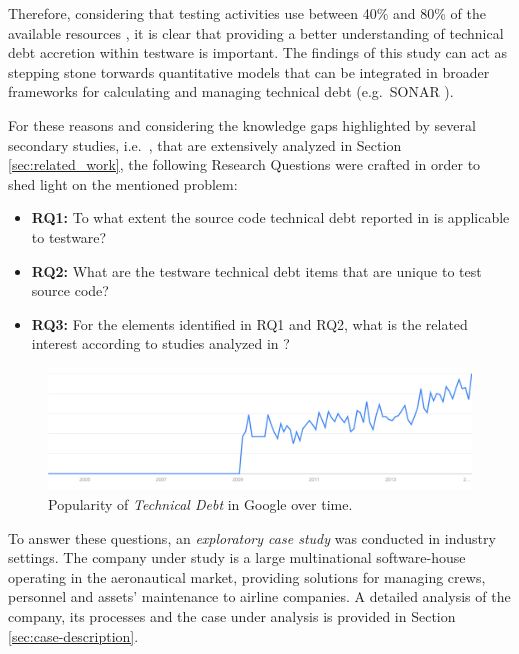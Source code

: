 Therefore, considering that testing activities use between 40\% and 80\% of the available resources \cite{exploratorying_testing_td}, it is clear that providing a better understanding of technical debt accretion within testware is important. The findings of this study can act as stepping stone torwards quantitative models that can be integrated in broader frameworks for calculating and managing technical debt (e.g.\ SONAR \cite{sonar_evaluate_td}).

For these reasons and considering the knowledge gaps highlighted by several secondary studies, i.e.\ \cite{mapping_study_td, exploration_of_td, exploration_of_td2}, that are extensively analyzed in Section \ref{sec:related_work}, the following Research Questions were crafted in order to shed light on the mentioned problem:

\begin{itemize}
    \itemsep0em

    \item \textbf{RQ1:} To what extent the source code technical debt reported in \cite{mapping_study_td} is applicable to testware?

    \item \textbf{RQ2:} What are the testware technical debt items that are unique to test source code?

    \item \textbf{RQ3:} For the elements identified in RQ1 and RQ2, what is the related interest according to studies analyzed in \cite{mapping_study_td}?

\end{itemize}

\begin{figure}[h]
\centering
\includegraphics[width=\textwidth]{figure/technicalDebt.pdf}
\caption{Popularity of \textit{Technical Debt} in Google over time.}
\label{fig:technical_debt_trend}
\end{figure}



To answer these questions, an \textit{exploratory case study} was conducted in industry settings. The company under study is a large multinational software-house operating in the aeronautical market, providing solutions for managing crews, personnel and assets' maintenance to airline companies. A detailed analysis of the company, its processes and the case under analysis is provided in Section \ref{sec:case-description}.

